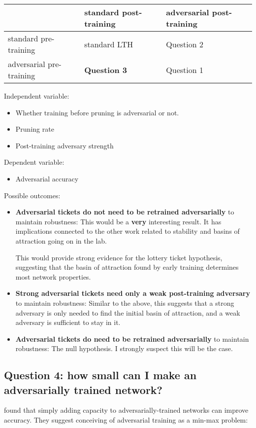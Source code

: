 \documentclass[11pt]{article}
\begin{document}
\begin{center}
\begin{tabular}{lll}
 & standard post-training & adversarial post-training\\
\hline
standard pre-training & standard LTH & Question 2\\
adversarial pre-training & \textbf{Question 3} & Question 1\\
\end{tabular}
\end{center}

Independent variable:
\begin{itemize}
\item Whether training before pruning is adversarial or not.
\item Pruning rate
\item Post-training adversary strength
\end{itemize}

Dependent variable:
\begin{itemize}
\item Adversarial accuracy
\end{itemize}

Possible outcomes:
\begin{itemize}
\item \textbf{Adversarial tickets do not need to be retrained adversarially} to maintain robustness:
This would be a \textbf{very} interesting result. It has implications connected to the other work
related to stability and basins of attraction going on in the lab.

This would provide strong evidence for the lottery ticket hypothesis, suggesting that the basin of attraction found by early training
determines most network properties.

\item \textbf{Strong adversarial tickets need only a weak post-training adversary} to maintain robustness:
Similar to the above, this suggests that a strong adversary is only needed to find the initial basin of attraction, and a weak
adversary is sufficient to stay in it.

\item \textbf{Adversarial tickets do need to be retrained adversarially} to maintain robustness:
The null hypothesis. I strongly suspect this will be the case.
\end{itemize}

\subsection{Question 4: how small can I make an adversarially trained network?}
\label{sec:orgc883343}
\citep{TowardsResistantAdversarial} found that simply adding capacity to adversarially-trained networks can
improve accuracy. They suggest conceiving of adversarial training as a min-max problem:
\end{document}
